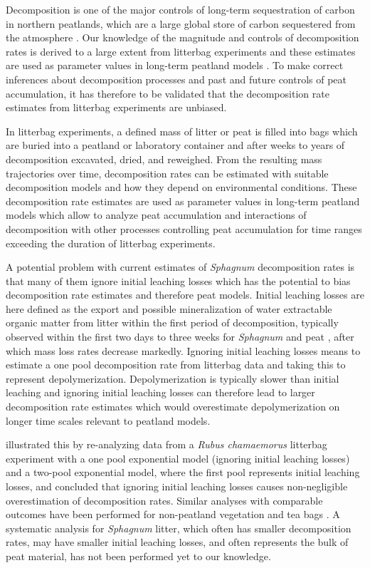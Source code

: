 \documentclass[bg, manuscript]{copernicus}
\begin{document}
\introduction[Introduction]

Decomposition is one of the major controls of long-term sequestration of carbon in northern peatlands, which are a large global store of carbon sequestered from the atmosphere \citep{Yu.2012}. Our knowledge of the magnitude and controls of decomposition rates is derived to a large extent from litterbag experiments \citep{Rydin.2013} and these estimates are used as parameter values in long-term peatland models \citep[e.g.][]{Frolking.2010}. To make correct inferences about decomposition processes and past and future controls of peat accumulation, it has therefore to be validated that the decomposition rate estimates from litterbag experiments are unbiased.

In litterbag experiments, a defined mass of litter or peat is filled into bags which are buried into a peatland or laboratory container and after weeks to years of decomposition excavated, dried, and reweighed. From the resulting mass trajectories over time, decomposition rates can be estimated with suitable decomposition models \citep[e.g.][]{Frolking.2001, Rovira.2010} and how they depend on environmental conditions. These decomposition rate estimates are used as parameter values in long-term peatland models which allow to analyze peat accumulation and interactions of decomposition with other processes controlling peat accumulation for time ranges exceeding the duration of litterbag experiments.

A potential problem with current estimates of \emph{Sphagnum} decomposition rates is that many of them ignore initial leaching losses which has the potential to bias decomposition rate estimates and therefore peat models. Initial leaching losses are here defined as the export and possible mineralization of water extractable organic matter from litter within the first period of decomposition, typically observed within the first two days to three weeks for \emph{Sphagnum} and peat \citep{Coulson.1978, Thormann.2001, Moore.2001, Kim.2014, Muller.2023}, after which mass loss rates decrease markedly. Ignoring initial leaching losses means to estimate a one pool decomposition rate from litterbag data and taking this to represent depolymerization. Depolymerization is typically slower than initial leaching and ignoring initial leaching losses can therefore lead to larger decomposition rate estimates which would overestimate depolymerization on longer time scales relevant to peatland models.

\citet{Yu.2001} illustrated this by re-analyzing data from a \emph{Rubus chamaemorus} litterbag experiment with a one pool exponential model (ignoring initial leaching losses) and a two-pool exponential model, where the first pool represents initial leaching losses, and concluded that ignoring initial leaching losses causes non-negligible overestimation of decomposition rates. Similar analyses with comparable outcomes have been performed for non-peatland vegetation \citep[e.g.,][]{Barlocher.1997} and tea bags \citep{Lind.2022}. A systematic analysis for \emph{Sphagnum} litter, which often has smaller decomposition rates, may have smaller initial leaching losses, and often represents the bulk of peat material, has not been performed yet to our knowledge.
\end{document}
